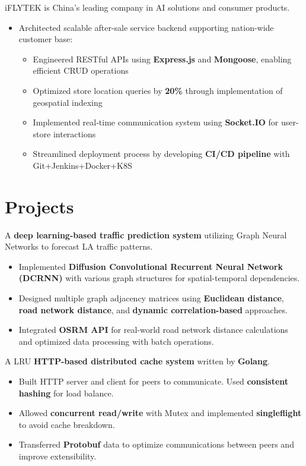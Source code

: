 \documentclass{resume}
\begin{document}
  iFLYTEK is China's leading company in AI solutions and consumer products.
\begin{itemize}
  \item Architected scalable after-sale service backend supporting nation-wide customer base:
  \begin{itemize}
    \item Engineered RESTful APIs using \textbf{Express.js} and \textbf{Mongoose}, enabling efficient CRUD operations
    \item Optimized store location queries by \textbf{20\%} through implementation of geospatial indexing
    \item Implemented real-time communication system using \textbf{Socket.IO} for user-store interactions
    \item Streamlined deployment process by developing \textbf{CI/CD pipeline} with Git+Jenkins+Docker+K8S
  \end{itemize}
\end{itemize}

\section{Projects}

A \textbf{deep learning-based traffic prediction system} utilizing Graph Neural Networks to forecast LA traffic patterns.
\begin{itemize}
\item Implemented \textbf{Diffusion Convolutional Recurrent Neural Network (DCRNN)} with various graph structures for spatial-temporal dependencies.
\item Designed multiple graph adjacency matrices using \textbf{Euclidean distance}, \textbf{road network distance}, and \textbf{dynamic correlation-based} approaches.
\item Integrated \textbf{OSRM API} for real-world road network distance calculations and optimized data processing with batch operations.
\end{itemize}

  A LRU \textbf{HTTP-based distributed cache system} written by \textbf{Golang}.
\begin{itemize}
  \item Built HTTP server and client for peers to communicate. Used \textbf{consistent hashing} for load balance.
  \item Allowed \textbf{concurrent read/write} with Mutex and implemented \textbf{singleflight} to avoid cache breakdown.
  \item Transferred \textbf{Protobuf} data to optimize communications between peers and improve extensibility.
\end{itemize}
\end{document}
